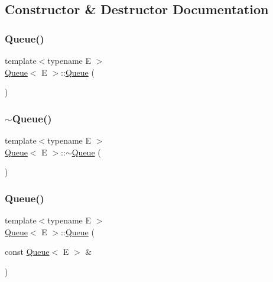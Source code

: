 \subsection{Constructor \& Destructor Documentation}
\mbox{\label{class_queue_ab09891e54b51dc677ee6efb350687ae4}} 
\subsubsection{\texorpdfstring{Queue()}{Queue()}\hspace{0.1cm}{\footnotesize\ttfamily [1/6]}}
{\footnotesize\ttfamily template$<$typename E $>$ \\
\mbox{\hyperlink{class_queue}{Queue}}$<$ E $>$\+::\mbox{\hyperlink{class_queue}{Queue}} (\begin{DoxyParamCaption}{ }\end{DoxyParamCaption})\hspace{0.3cm}{\ttfamily [inline]}}

\mbox{\label{class_queue_a49fe82adb8dc2fb62ab53876a6933d0f}} 
\subsubsection{\texorpdfstring{$\sim$Queue()}{~Queue()}\hspace{0.1cm}{\footnotesize\ttfamily [1/3]}}
{\footnotesize\ttfamily template$<$typename E $>$ \\
\mbox{\hyperlink{class_queue}{Queue}}$<$ E $>$\+::$\sim$\mbox{\hyperlink{class_queue}{Queue}} (\begin{DoxyParamCaption}{ }\end{DoxyParamCaption})\hspace{0.3cm}{\ttfamily [inline]}}

\mbox{\label{class_queue_ac071ee553005a67737d35edeeaafca5b}} 
\subsubsection{\texorpdfstring{Queue()}{Queue()}\hspace{0.1cm}{\footnotesize\ttfamily [2/6]}}
{\footnotesize\ttfamily template$<$typename E $>$ \\
\mbox{\hyperlink{class_queue}{Queue}}$<$ E $>$\+::\mbox{\hyperlink{class_queue}{Queue}} (\begin{DoxyParamCaption}\item[{const \mbox{\hyperlink{class_queue}{Queue}}$<$ E $>$ \&}]{ }\end{DoxyParamCaption})\hspace{0.3cm}{\ttfamily [private]}}

